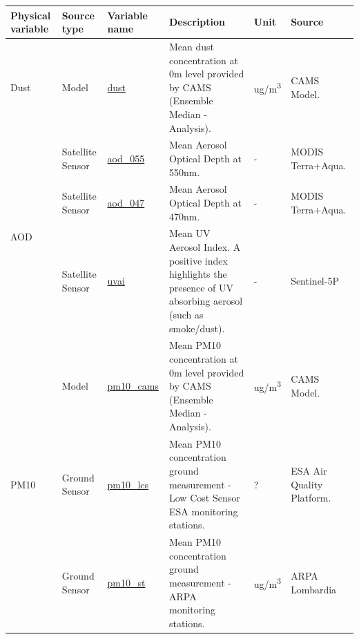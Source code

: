 \begin{center}
\setlength{\arrayrulewidth}{1.5pt}
\begin{longtable}{ |p{2cm}|p{1.5cm}|p{2.3cm}|p{4cm}|p{1cm}|p{2cm}| } 
\hline
\textbf{Physical variable} & \textbf{Source type}  & \textbf{Variable name}  & \textbf{Description}  & \textbf{Unit}  & \textbf{Source}\\ 
\hline
\multirow{1}{4em}{Dust} & Model  & \underline{dust} & Mean dust concentration at 0m level provided by CAMS (Ensemble Median - Analysis).\par & ug/m\textsuperscript{3} & CAMS Model.\\ \hline

\multirow{3}{4em}{AOD} & Satellite \newline Sensor  & \underline{aod\_055} & Mean Aerosol Optical Depth at 550nm.\par & - & MODIS Terra+Aqua.\\ 
& Satellite \newline Sensor  & \underline{aod\_047} &  Mean Aerosol Optical Depth at 470nm.\par & - & MODIS Terra+Aqua.\\ 
& Satellite \newline Sensor & \underline{uvai} &  Mean UV Aerosol Index. A positive index highlights the presence of UV absorbing aerosol (such as smoke/dust). \par & - & Sentinel-5P\\ \hline

\multirow{3}{4em}{PM10} & Model  & \underline{pm10\_cams} & Mean PM10 concentration at 0m level provided by CAMS  (Ensemble Median - Analysis).\par & ug/m\textsuperscript{3} & CAMS Model.\\ 
& Ground \newline Sensor  & \underline{pm10\_lcs} &  Mean PM10 concentration ground measurement - Low Cost Sensor ESA monitoring stations.\par & ? & ESA Air Quality Platform.\\ 
& Ground \newline Sensor & \underline{pm10\_st} &  Mean PM10 concentration ground measurement - ARPA monitoring stations. \par & ug/m\textsuperscript{3} & ARPA \newline Lombardia\\ \hline


\end{longtable}
\end{center}
